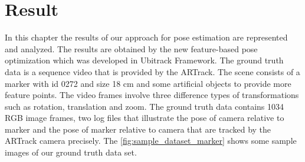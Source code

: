 \chapter{Result}\label{chapter:Result}
In this chapter the results of our approach for pose estimation are represented and analyzed. The results are obtained by the new feature-based pose optimization which was developed in Ubitrack Framework. The ground truth data is a sequence video that is provided by the ARTrack. The scene consists of a marker with id 0272 and size 18 cm and some artificial objects to provide more feature points. The video frames involve three difference types of transformations such as rotation, translation and zoom. The ground truth data contains 1034 RGB image frames, two log files that illustrate the pose of camera relative to marker and the pose of marker relative to camera that are tracked by the ARTrack camera precisely. The \autoref{fig:sample_dataset_marker} shows some sample images of our ground truth data set.

